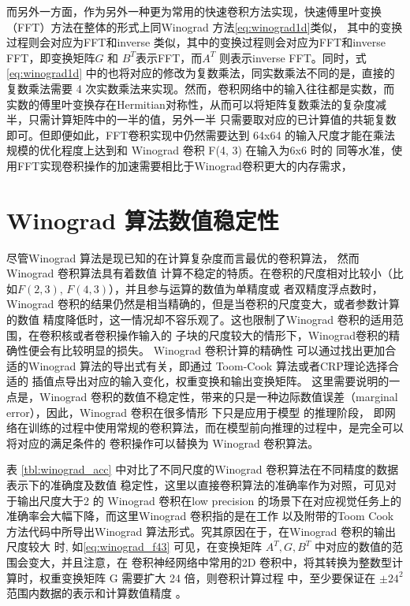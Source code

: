 而另外一方面，作为另外一种更为常用的快速卷积方法实现，快速傅里叶变换（FFT）方法在整体的形式上同Winograd 方法\ref{eq:winograd1d}类似，
其中的变换过程则会对应为FFT和inverse 类似，其中的变换过程则会对应为FFT和inverse
 FFT，即变换矩阵$G$ 和 $B^T$表示FFT，而$A^T$ 则表示inverse FFT。同时，式\ref{eq:winograd1d} 中的也将对应的修改为复数乘法，同实数乘法不同的是，直接的复数乘法需要
 4 次实数乘法来实现。然而，卷积网络中的输入往往都是实数，而实数的傅里叶变换存在Hermitian对称性，从而可以将矩阵复数乘法的复杂度减半，只需计算矩阵中的一半的值，另外一半
 只需要取对应的已计算值的共轭复数即可。但即便如此，FFT卷积实现中仍然需要达到 64x64 的输入尺度才能在乘法规模的优化程度上达到和 Winograd 卷积 F(4, 3) 在输入为6x6 时的
 同等水准，使用FFT实现卷积操作的加速需要相比于Winograd卷积更大的内存需求，


\section{Winograd 算法数值稳定性}

尽管Winograd 算法是现已知的在计算复杂度而言最优的卷积算法， 然而 Winograd 卷积算法具有着数值
计算不稳定的特质。在卷积的尺度相对比较小（比如$F(2,3)$, $F(4, 3)$），并且参与运算的数值为单精度或
者双精度浮点数时，Winograd 卷积的结果仍然是相当精确的，但是当卷积的尺度变大，或者参数计算的数值
精度降低时，这一情况却不容乐观了。这也限制了Winograd 卷积的适用范围，在卷积核或者卷积操作输入的
子块的尺度较大的情形下，Winograd卷积的精确性便会有比较明显的损失。 Winograd 卷积计算的精确性
可以通过找出更加合适的Winograd 算法的导出式有关，即通过 Toom-Cook 算法或者CRP理论选择合适的
插值点导出对应的输入变化，权重变换和输出变换矩阵。 这里需要说明的一点是，Winograd 
卷积的数值不稳定性，带来的只是一种边际数值误差（marginal error），因此，Winograd 卷积在很多情形
下只是应用于模型 的推理阶段，
即网络在训练的过程中使用常规的卷积算法，而在模型前向推理的过程中，是完全可以将对应的满足条件的
卷积操作可以替换为 Winograd 卷积算法。

表 \ref{tbl:winograd_acc} 中对比了不同尺度的Winograd 卷积算法在不同精度的数据表示下的准确度及数值
稳定性，这里以直接卷积算法的准确率作为对照，可见对于输出尺度大于2 的 Winograd 卷积在low precision 
的场景下在对应视觉任务上的准确率会大幅下降，而这里Winograd 卷积指的是在工作\cite{Lavin2015FastAF}
以及附带的Toom Cook 方法代码中所导出Winograd 算法形式。究其原因在于，在Winograd 卷积的输出尺度较大
时, 如\ref{eq:winograd_f43} 可见，在变换矩阵 $A^T, G, B^T$ 中对应的数值的范围会变大，并且注意，在
卷积神经网络中常用的2D 卷积中，将其转换为整数型计算时，权重变换矩阵 G 需要扩大 24 倍，则卷积计算过程
中，至少要保证在 $\pm24^2$ 范围内数据的表示和计算数值精度 。

